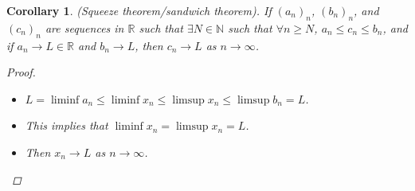 \documentclass[10pt]{article}
\newcommand{\N}{\mathbb{N}}
\newcommand{\R}{\mathbb{R}}
\newtheorem{corollary}[theorem]{Corollary}
\theoremstyle{definition}
\theoremstyle{remark}
\begin{document}
\begin{corollary}
    (Squeeze theorem/sandwich theorem).
    If $(a_n)_n$, $(b_n)_n$, and $(c_n)_n$ are sequences in $\R$ such that $\exists N \in \N$ such that $\forall n \geq N$, $a_n \leq c_n \leq b_n$,
    and if $a_n \to L \in \R$ and $b_n \to L$, then $c_n \to L$ as $n \to \infty$.

    \begin{proof}
        \hfill
        \begin{itemize}
            \item $L = \liminf a_n \leq \liminf x_n \leq \limsup x_n \leq \limsup b_n = L$.
            \item This implies that $\liminf x_n = \limsup x_n = L$.
            \item Then $x_n \to L$ as $n \to \infty$.
        \end{itemize}
    \end{proof}
\end{corollary}
\end{document}
